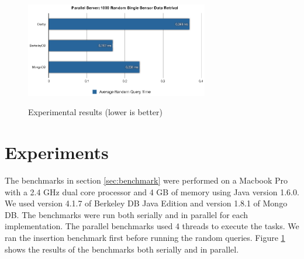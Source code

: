 \documentclass{sig-alternate}
\begin{document}
\begin{figure}
	{
		\label{exp:parallel-single}
		\includegraphics[width=8cm]{images/parallel-single-query.eps}
	}
	\hspace{1cm}
	\hspace{1cm}
	\caption{Experimental results (lower is better)}
	\label{exp:experimental-graphs}
\end{figure}

\section{Experiments}
\label{sec:experiments}

The benchmarks in section \ref{sec:benchmark} were performed on a Macbook Pro with a 2.4 GHz dual core processor and 4 GB of memory using Java version 1.6.0.  We used version 4.1.7 of Berkeley DB Java Edition and version 1.8.1 of Mongo DB.  The benchmarks were run both serially and in parallel for each implementation.  The parallel benchmarks used 4 threads to execute the tasks.  We ran the insertion benchmark first before running the random queries.  Figure \ref{exp:experimental-graphs} shows the results of the benchmarks both serially and in parallel.
\end{document}
